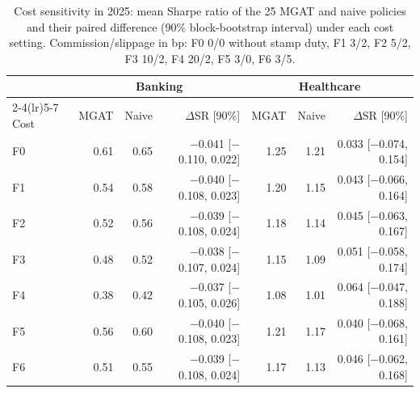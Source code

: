 \begin{table}[!t]\centering\small\color{blue}
\caption{Cost sensitivity in 2025: mean Sharpe ratio of the 25 MGAT and naive policies and their paired difference (90\% block-bootstrap interval) under each cost setting. Commission/slippage in bp: F0 0/0 without stamp duty, F1 3/2, F2 5/2, F3 10/2, F4 20/2, F5 3/0, F6 3/5.}
\label{tab:cost}
\setlength{\tabcolsep}{3pt}
\begin{tabular}{lrrrrrr}\toprule
 & \multicolumn{3}{c}{Banking} & \multicolumn{3}{c}{Healthcare} \\ \cmidrule(lr){2-4}\cmidrule(lr){5-7}
Cost & MGAT & Naive & $\Delta$SR [90\%] & MGAT & Naive & $\Delta$SR [90\%] \\ \midrule
F0 & 0.61 & 0.65 & $-$0.041 [$-$0.110, 0.022] & 1.25 & 1.21 & 0.033 [$-$0.074, 0.154] \\
F1 & 0.54 & 0.58 & $-$0.040 [$-$0.108, 0.023] & 1.20 & 1.15 & 0.043 [$-$0.066, 0.164] \\
F2 & 0.52 & 0.56 & $-$0.039 [$-$0.108, 0.024] & 1.18 & 1.14 & 0.045 [$-$0.063, 0.167] \\
F3 & 0.48 & 0.52 & $-$0.038 [$-$0.107, 0.024] & 1.15 & 1.09 & 0.051 [$-$0.058, 0.174] \\
F4 & 0.38 & 0.42 & $-$0.037 [$-$0.105, 0.026] & 1.08 & 1.01 & 0.064 [$-$0.047, 0.188] \\
F5 & 0.56 & 0.60 & $-$0.040 [$-$0.108, 0.023] & 1.21 & 1.17 & 0.040 [$-$0.068, 0.161] \\
F6 & 0.51 & 0.55 & $-$0.039 [$-$0.108, 0.024] & 1.17 & 1.13 & 0.046 [$-$0.062, 0.168] \\
\bottomrule\end{tabular}
\end{table}